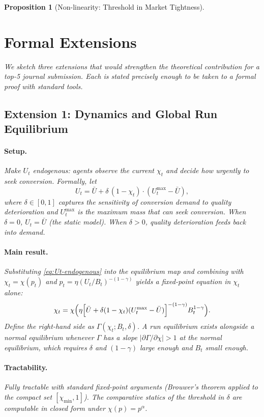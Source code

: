 \documentclass[12pt]{article}
\newtheorem{proposition}{Proposition}
\theoremstyle{definition}
\newcommand{\1}[1]{\mathds{1}\left[#1\right]}
\begin{document}
\begin{proposition}[Non-linearity: Threshold in Market Tightness]
\section{Formal Extensions}
\label{sec:extensions}

We sketch three extensions that would strengthen the theoretical contribution
for a top-5 journal submission. Each is stated precisely enough to be taken
to a formal proof with standard tools.

\subsection{Extension 1: Dynamics and Global Run Equilibrium}

\paragraph{Setup.} Make $U_t$ endogenous: agents observe the current $\chi_t$
and decide how urgently to seek conversion. Formally, let
\begin{equation}
  U_t = \bar{U} + \delta\,(1 - \chi_t) \cdot (U_t^{\max} - \bar{U}),
  \label{eq:Ut-endogenous}
\end{equation}
where $\delta \in [0,1]$ captures the sensitivity of conversion demand to
quality deterioration and $U_t^{\max}$ is the maximum mass that can seek
conversion. When $\delta = 0$, $U_t = \bar{U}$ (the static model). When
$\delta > 0$, quality deterioration feeds back into demand.

\paragraph{Main result.} Substituting \eqref{eq:Ut-endogenous} into the
equilibrium map and combining with $\chi_t = \chi(p_t)$ and $p_t =
\eta(U_t/B_t)^{-(1-\gamma)}$ yields a fixed-point equation in $\chi_t$
alone:
\[
  \chi_t = \chi\Bigl(\eta\Bigl[\bar{U} + \delta(1-\chi_t)(U_t^{\max}
  - \bar{U})\Bigr]^{-(1-\gamma)} B_t^{1-\gamma}\Bigr).
\]
Define the right-hand side as $\Gamma(\chi_t; B_t, \delta)$. A run equilibrium
exists alongside a normal equilibrium whenever $\Gamma$ has a slope
$|\partial\Gamma/\partial\chi| > 1$ at the normal equilibrium, which requires
$\delta$ and $(1-\gamma)$ large enough and $B_t$ small enough.

\paragraph{Tractability.} Fully tractable with standard fixed-point arguments
(Brouwer's theorem applied to the compact set $[\chi_{\min}, 1]$). The
comparative statics of the threshold in $\delta$ are computable in closed
form under $\chi(p) = p^{\alpha}$.


\end{proposition}
\end{document}
